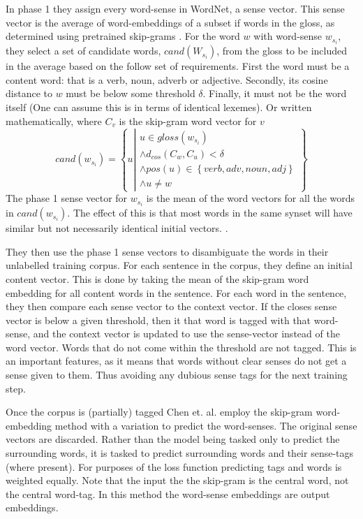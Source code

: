 \documentclass[12pt,parskip]{komatufte}
\begin{document}
In phase 1 they assign every word-sense in WordNet, a sense vector.
This sense vector is the average of word-embeddings of a subset if words in the gloss,
as determined using pretrained skip-grams \parencite{mikolov2013efficient}.
For the word $w$ with word-sense $w_{s_i}$,
they select a set of candidate words, $cand(W_{s_i})$, from the gloss to be included in the average
based on the follow set of requirements.
First the word must be a content word: that is a verb, noun, adverb or adjective.
Secondly, its cosine distance to $w$ must be below some threshold $\delta$.
Finally, it must not be the word itself (One can assume this is in terms of identical lexemes).
Or written mathematically, where $C_v$ is the skip-gram word vector for $v$
\begin{equation}
cand(w_{s_{i}})=\left\{ u\left|\begin{array}{c}
u\in gloss(w_{s_{i}})\\
\wedge d_{cos}(C_w,C_u)<\delta\\
\wedge pos(u)\in\left\{ verb,adv,noun,adj\right\} \\
\wedge u\ne w
\end{array}\right.\right\} 
\end{equation}
The phase 1 sense vector for $w_{s_i}$ is the mean of the word vectors for all the words in $cand(w_{s_{i}})$.
The effect of this is that most words in the same synset will have similar but not necessarily identical initial vectors.
.



They then use the phase 1 sense vectors to disambiguate the words in their unlabelled training corpus.
For each sentence in the corpus, they define an initial content vector.
This is done by taking the mean of the skip-gram word embedding for all content words in the sentence.
For each word in the sentence, they then compare each sense vector to the context vector.
If the closes sense vector is below a given threshold,
then it that word is tagged with that word-sense, and the context vector is updated to use the sense-vector instead of the word vector.
Words that do not come within the threshold are not tagged.
This is an important features, as it means that words without clear senses do not get a sense given to them.
Thus avoiding any dubious sense tags for the next training step.


Once the corpus is (partially) tagged Chen et. al. employ the skip-gram word-embedding method with a variation to predict the word-senses.
The original sense vectors are discarded.
Rather than the model being tasked only to predict the surrounding words,
it is tasked to predict surrounding words and their sense-tags (where present).
For purposes of the loss function predicting tags and words is weighted equally.
Note that the input the the skip-gram is the central word, not the central word-tag.
In this method the word-sense embeddings are output embeddings.
\end{document}
